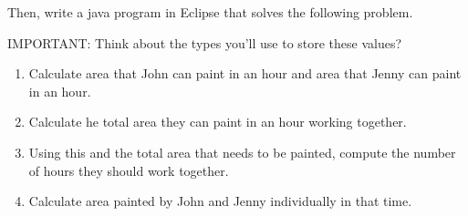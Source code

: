\begin{questions}
Then, write a java program in Eclipse that solves the following problem. 

IMPORTANT: Think about the types you'll use to store these values?

\begin{solution}

\begin{enumerate}
	\item Calculate area that John can paint in an hour and area that Jenny can paint in an hour.
	\item Calculate he total area they can paint in an hour working together.	
	\item Using this and the total area that needs to be painted, compute the number of hours they should work together.
	\item Calculate area painted by John and Jenny individually in that time.
\end{enumerate}


\end{solution}


\end{questions}

